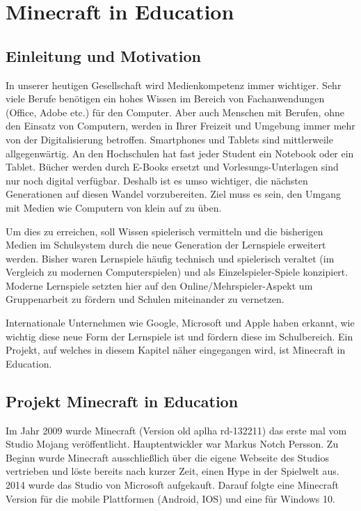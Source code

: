 \chapter{Minecraft in Education}

\section{Einleitung und Motivation}

In unserer heutigen Gesellschaft wird Medienkompetenz immer wichtiger. Sehr viele Berufe benötigen ein hohes Wissen im Bereich von Fachanwendungen (Office, Adobe etc.) für den Computer. 
Aber auch Menschen mit Berufen, ohne den Einsatz von Computern, werden in Ihrer Freizeit und Umgebung immer mehr von der Digitalisierung betroffen.
Smartphones und Tablets sind mittlerweile allgegenwärtig. An den Hochschulen hat fast jeder Student ein Notebook oder ein Tablet.
Bücher werden durch E-Books ersetzt und Vorlesungs-Unterlagen sind nur noch digital verfügbar. Deshalb ist es umso wichtiger, die nächsten Generationen auf diesen Wandel vorzubereiten. 
Ziel muss es sein, den Umgang mit Medien wie Computern von klein auf zu üben.

Um dies zu erreichen, soll Wissen spielerisch vermitteln und die bisherigen Medien im Schulsystem durch die neue Generation der Lernspiele erweitert werden.
Bisher waren Lernspiele häufig technisch und spielerisch veraltet (im Vergleich zu modernen Computerspielen) und als Einzelspieler-Spiele konzipiert. Moderne Lernspiele setzten hier auf den Online/Mehrspieler-Aspekt um Gruppenarbeit zu fördern und Schulen miteinander zu vernetzen.

Internationale Unternehmen wie Google, Microsoft und Apple haben erkannt, wie wichtig diese neue Form der Lernspiele ist und fördern diese im Schulbereich.
Ein Projekt, auf welches in diesem Kapitel näher eingegangen wird, ist Minecraft in Education.

\section{Projekt Minecraft in Education}

Im Jahr 2009 wurde Minecraft (Version old aplha rd-132211) das erste mal vom
Studio Mojang veröffentlicht. Hauptentwickler war Markus Notch Persson. Zu Beginn wurde Minecraft
ausschließlich über die eigene Webseite des Studios vertrieben und löste bereits nach kurzer Zeit,
einen Hype in der Spielwelt aus. 2014 wurde das Studio von Microsoft aufgekauft. Darauf folgte eine Minecraft Version für die mobile Plattformen (Android, IOS) und eine für Windows 10.
\cite{WikiMinecraft}\cite{HeiseMicrosoft}

